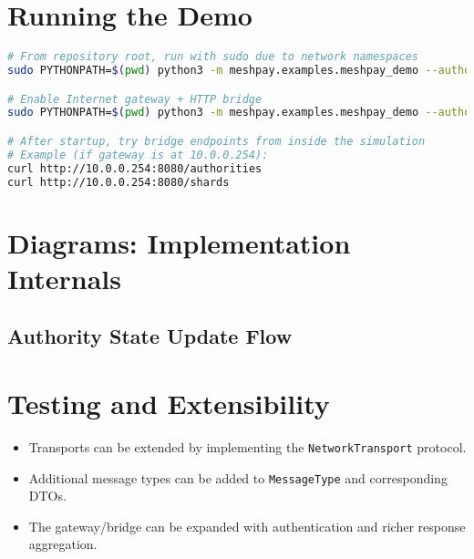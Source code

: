 \documentclass[11pt,a4paper]{article}
\begin{document}
\section{Running the Demo}
\begin{lstlisting}[language=bash]
# From repository root, run with sudo due to network namespaces
sudo PYTHONPATH=$(pwd) python3 -m meshpay.examples.meshpay_demo --authorities 3 --clients 2

# Enable Internet gateway + HTTP bridge
sudo PYTHONPATH=$(pwd) python3 -m meshpay.examples.meshpay_demo --authorities 3 --clients 2 --internet --gateway-port 8080

# After startup, try bridge endpoints from inside the simulation
# Example (if gateway is at 10.0.0.254):
curl http://10.0.0.254:8080/authorities
curl http://10.0.0.254:8080/shards
\end{lstlisting}

\section{Diagrams: Implementation Internals}
\subsection{Authority State Update Flow}
\begin{center}
\end{center}

\section{Testing and Extensibility}
\begin{itemize}[noitemsep]
  \item Transports can be extended by implementing the \texttt{NetworkTransport} protocol.
  \item Additional message types can be added to \texttt{MessageType} and corresponding DTOs.
  \item The gateway/bridge can be expanded with authentication and richer response aggregation.
\end{itemize}
\end{document}
